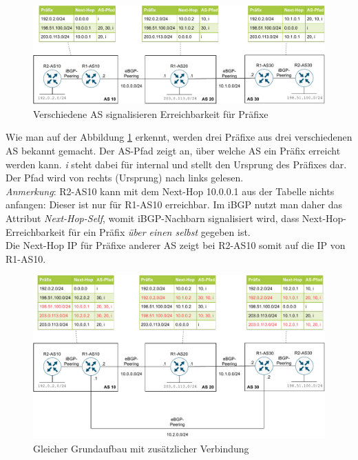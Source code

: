 \begin{figure}[h]
  \centering
  \includegraphics[scale=0.75]{Figures/ebgp_peerings.pdf}
  \caption{Verschiedene AS signalisieren Erreichbarkeit für Präfixe}
  \label{grafik: ebgp_peerings}
\end{figure}\FloatBarrier

Wie man auf der Abbildung \ref{grafik: ebgp_peerings} erkennt, werden drei Präfixe aus drei verschiedenen AS bekannt gemacht. Der AS-Pfad zeigt an, über welche AS ein Präfix erreicht werden kann. \textit{i} steht dabei für internal und stellt den Ursprung des Präfixes dar. Der Pfad wird von rechts (Ursprung) nach links gelesen.\cite{odom2010}\\
\textit{Anmerkung}: R2-AS10 kann mit dem Next-Hop 10.0.0.1 aus der Tabelle nichts anfangen: Dieser ist nur für R1-AS10 erreichbar. Im iBGP nutzt man daher das Attribut \textit{Next-Hop-Self}, womit iBGP-Nachbarn signalisiert wird, dass Next-Hop-Erreichbarkeit für ein Präfix \textit{über einen selbst} gegeben ist.\cite[S.468-471]{odom2010}\\
Die Next-Hop IP für Präfixe anderer AS zeigt bei R2-AS10 somit auf die IP von R1-AS10.

\begin{figure}[h]
  \centering
  \includegraphics[scale=0.75]{Figures/ebgp_peerings_additional_connection.pdf}
  \caption{Gleicher Grundaufbau mit zusätzlicher Verbindung}
  \label{grafik: ebgp_peerings_additional_connection}
\end{figure}\FloatBarrier

